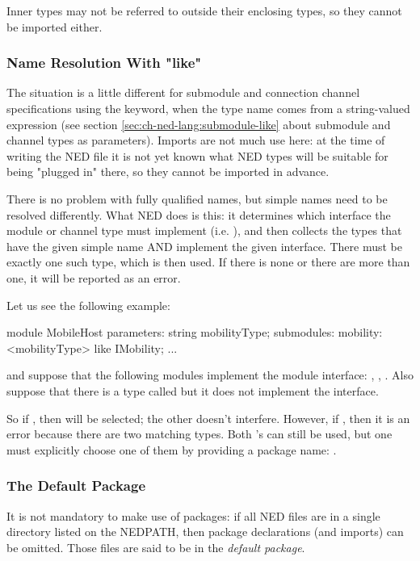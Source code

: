Inner types may not be referred to outside their enclosing types, so they
cannot be imported either.


\subsubsection{Name Resolution With "like"}

The situation is a little different for submodule and connection channel
specifications using the  keyword, when the type name comes
from a string-valued expression (see section
\ref{sec:ch-ned-lang:submodule-like} about submodule and channel types as
parameters). Imports are not much use here: at the time of writing the NED
file it is not yet known what NED types will be suitable for being "plugged
in" there, so they cannot be imported in advance.

There is no problem with fully qualified names, but simple names need
to be resolved differently. What NED does is this: it determines which
interface the module or channel type must implement (i.e. ),
and then collects the types that have the given simple name AND implement
the given interface. There must be exactly one such type, which is then used.
If there is none or there are more than one, it will be reported as an error.

Let us see the following example:

\begin{ned}
module MobileHost
{
    parameters:
        string mobilityType;
    submodules:
        mobility: <mobilityType> like IMobility;
        ...
}
\end{ned}

and suppose that the following modules implement the  module
interface: , ,
. Also suppose that there is a type
called  but it does not implement the
interface.

So if , then
 will be selected; the other
 doesn't interfere. However, if
, then it is an error because there are two
matching  types. Both 's can still be used,
but one must explicitly choose one of them by providing a package name:
.


\subsubsection{The Default Package}

It is not mandatory to make use of packages: if all NED files are in a
single directory listed on the NEDPATH, then package declarations (and
imports) can be omitted. Those files are said to be in the \textit{default
package}.






